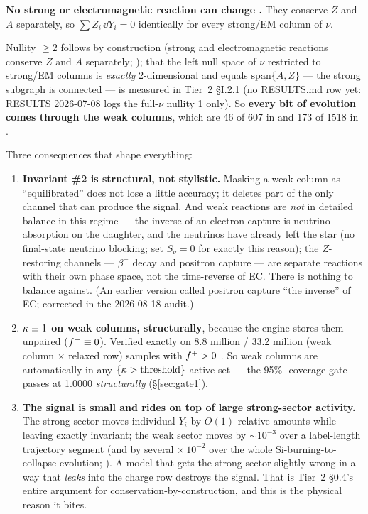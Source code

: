 \begin{invariant}
\textbf{No strong or electromagnetic reaction can change \Ye.} They conserve
$Z$ and $A$ separately, so $\sum Z_i\,\dd Y_i = 0$ identically for every
strong/EM column of $\nu$.
\end{invariant}

Nullity $\ge 2$ follows by construction (strong and electromagnetic reactions
conserve $Z$ and $A$ separately; \citealt[\S I]{langanke2003a}); that the left
null space of $\nu$ restricted to strong/EM columns is \emph{exactly}
2-dimensional and equals $\mathrm{span}\{A, Z\}$ --- the strong subgraph is
connected --- is measured in Tier~2 \S I.2.1 (no RESULTS.md row yet: RESULTS
2026-07-08 logs the full-$\nu$ nullity 1 only). So \textbf{every bit of \Ye{}
evolution comes through the weak columns}, which are 46 of 607 in  and
173 of 1518 in  .

Three consequences that shape everything:

\begin{enumerate}
\item \textbf{Invariant \#2 is structural, not stylistic.} Masking a weak
  column as ``equilibrated'' does not lose a little accuracy; it deletes part
  of the only channel that can produce the signal. And weak reactions are
  \emph{not} in detailed balance in this regime --- the inverse of an electron
  capture is neutrino absorption on the daughter, and the neutrinos have
  already left the star (no final-state neutrino blocking;
  \citealt{langanke2000} set $S_\nu = 0$ for exactly this reason); the
  $Z$-restoring channels --- $\beta^{-}$ decay and positron capture --- are
  separate reactions with their own phase space, not the time-reverse of EC.
  There is nothing to balance against. (An earlier version called positron
  capture ``the inverse'' of EC; corrected in the 2026-08-18 audit.)
\item \textbf{$\kappa \equiv 1$ on weak columns, structurally}, because the
  engine stores them unpaired ($f^{-} \equiv 0$). Verified exactly on 8.8
  million / 33.2 million (weak column $\times$ relaxed row) samples with
  $f^{+} > 0$ . So weak columns are automatically in any
  $\{\kappa > \text{threshold}\}$ active set --- the 95\% \Ye-coverage gate
  passes at 1.0000 \emph{structurally} (\S\ref{sec:gate1}).
\item \textbf{The signal is small and rides on top of large strong-sector
  activity.} The strong sector moves individual $Y_i$ by $O(1)$ relative
  amounts while leaving \Ye{} exactly invariant; the weak sector moves \Ye{} by
  $\sim 10^{-3}$ over a label-length trajectory segment (and by several
  $\times\,10^{-2}$ over the whole Si-burning-to-collapse evolution;
  \citealt{heger2001}). A model that gets the strong sector slightly wrong in a
  way that \emph{leaks} into the charge row destroys the signal. That is
  Tier~2 \S 0.4's entire argument for conservation-by-construction, and this
  is the physical reason it bites.
\end{enumerate}

